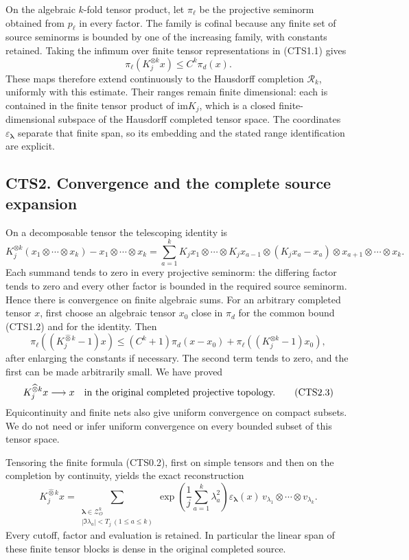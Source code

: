 On the algebraic \(k\)-fold tensor product, let \(\pi_\ell\) be the
projective seminorm obtained from \(p_\ell\) in every factor. The family
is cofinal because any finite set of source seminorms is bounded by one
of the increasing family, with constants retained. Taking the infimum
over finite tensor representations in (CTS1.1) gives \[
\pi_\ell(K_j^{\otimes k}x)\le C^k\pi_d(x).
\tag{CTS1.2}
\] These maps therefore extend continuously to the Hausdorff completion
\(\mathscr R_k\), uniformly with this estimate. Their ranges remain
finite dimensional: each is contained in the finite tensor product of
\(\mathrm{im}K_j\), which is a closed finite-dimensional subspace of the
Hausdorff completed tensor space. The coordinates
\(\varepsilon_{\boldsymbol\lambda}\) separate that finite span, so its
embedding and the stated range identification are explicit.

\subsection{CTS2. Convergence and the complete source
expansion}\label{cts2.-convergence-and-the-complete-source-expansion}

On a decomposable tensor the telescoping identity is \[
K_j^{\otimes k}(x_1\otimes\cdots\otimes x_k)-x_1\otimes\cdots\otimes x_k
=\sum_{a=1}^k K_jx_1\otimes\cdots\otimes K_jx_{a-1}
\otimes(K_jx_a-x_a)\otimes x_{a+1}\otimes\cdots\otimes x_k.
\tag{CTS2.1}
\] Each summand tends to zero in every projective seminorm: the
differing factor tends to zero and every other factor is bounded in the
required source seminorm. Hence there is convergence on finite algebraic
sums. For an arbitrary completed tensor \(x\), first choose an algebraic
tensor \(x_0\) close in \(\pi_d\) for the common bound (CTS1.2) and for
the identity. Then \[
\pi_\ell((K_j^{\widehat\otimes k}-1)x)
\le(C^k+1)\pi_d(x-x_0)+\pi_\ell((K_j^{\otimes k}-1)x_0),
\tag{CTS2.2}
\] after enlarging the constants if necessary. The second term tends to
zero, and the first can be made arbitrarily small. We have proved \[
K_j^{\widehat\otimes k}x\longrightarrow x\quad\hbox{in the original completed projective topology.}
\tag{CTS2.3}
\] Equicontinuity and finite nets also give uniform convergence on
compact subsets. We do not need or infer uniform convergence on every
bounded subset of this tensor space.

Tensoring the finite formula (CTS0.2), first on simple tensors and then
on the completion by continuity, yields the exact reconstruction \[
K_j^{\widehat\otimes k}x=
\sum_{\substack{\boldsymbol\lambda\in\mathscr Z_O^k\\|\Im\lambda_a|<T_j\ (1\le a\le k)}}
\exp\!\left(\frac1j\sum_{a=1}^k\lambda_a^2\right)
\varepsilon_{\boldsymbol\lambda}(x)
\,v_{\lambda_1}\otimes\cdots\otimes v_{\lambda_k}.
\tag{CTS2.4}
\] Every cutoff, factor and evaluation is retained. In particular the
linear span of these finite tensor blocks is dense in the original
completed source.

